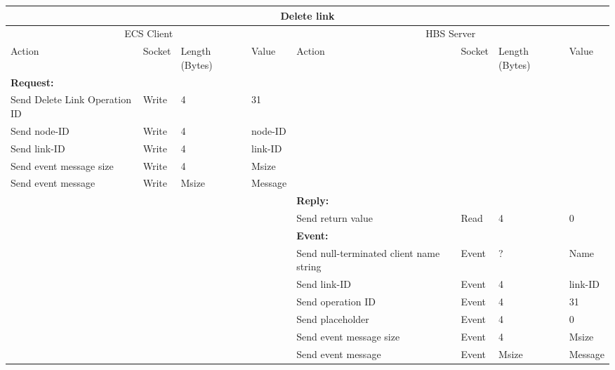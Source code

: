 \bigskip
\small
\begin{tabular}{|p{1.2in}|p{.4in}|p{.4in}|p{.5in}|p{1.2in}|p{.4in}|p{.4in}|p{.5in} |} \hline
\multicolumn{8}{|c|}{{\bf Delete link}} \\ \hline
\multicolumn{4}{|c|}{ECS Client} & \multicolumn{4}{|c|}{HBS Server} \\ \hline
Action            & Socket & Length  
                            (Bytes)& Value & Action       & Socket & Length 
                                                                    (Bytes)& Value \\ \hline
\multicolumn{4}{|l}{{\bf Request:}}&\multicolumn{4}{|l|}{~} \\ \hline
Send Delete Link Operation ID  & Write  & 4     & 31     &              &        &       &       \\ \hline
Send node-ID      & Write  & 4     &  node-ID &           &        &       &       \\ \hline
Send link-ID    & Write  & 4     & link-ID   &              &        &       &       \\ \hline
Send event
message size      & Write  & 4     &  Msize &         &        &       &       \\ \hline
Send event message
                  & Write  &  Msize  &  Message &     &        &       &       \\ \hline
\multicolumn{4}{|l}{~}&\multicolumn{4}{|l|}{{\bf Reply:}} \\ \hline
                  &        &       &       & Send return
                                             value        & Read   &  4    & 0       \\ \hline
\multicolumn{4}{|l}{~}&\multicolumn{4}{|l|}{{\bf Event:}} \\ \hline
                  &        &       &       & Send null-terminated client
                                             name string  & Event  &  ?    & Name  \\ \hline
                  &        &       &       & Send link-ID  & Event  &   4   &   link-ID    \\  \hline
                  &        &       &       & Send operation 
                                             ID           & Event  &   4   &  31   \\ \hline
                  &        &       &       & Send placeholder     & Event  &   4   &  0    \\ \hline
                  &        &       &       & Send event message
                                                  size    & Event  &   4   &  Msize \\ \hline
                  &        &       &       & Send event message
                                                          & Event  & Msize & Message  \\ \hline
\end{tabular}
\normalsize
\bigskip




